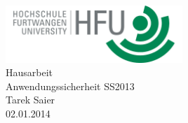 \documentclass[pdftex,fontsize=11pt,a4paper]{scrbook}
\begin{document}
\begin{titlepage}
\thispagestyle{empty}
\begin{center}
\includegraphics[width=0.5\textwidth]{hfu.png}~\\[1.5cm]
\Huge Hausarbeit\\[0.4cm]
\Huge Anwendungssicherheit SS2013\\[1cm]
\LARGE Tarek Saier\\[0.2cm]
\normalsize 02.01.2014
\end{center}
\end{titlepage}
\end{document}
